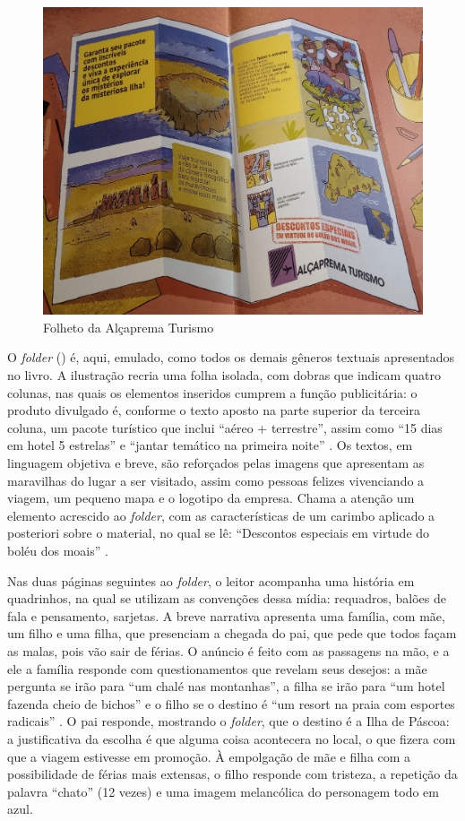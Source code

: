 \documentclass[portuguese]{textolivre}
\begin{document}
\begin{figure}[h!]
    \centering
    \includegraphics[width=0.85\linewidth]{Fig1.jpeg}
    \caption{Folheto da Alçaprema Turismo}
    \label{fig1}
\end{figure}

O \textit{folder} () é, aqui, emulado, como todos os demais gêneros
textuais apresentados no livro. A ilustração recria uma folha isolada, com
dobras que indicam quatro colunas, nas quais os elementos inseridos cumprem a
função publicitária: o produto divulgado é, conforme o texto aposto na parte
superior da terceira coluna, um pacote turístico que inclui “aéreo +
terrestre”, assim como “15 dias em hotel 5 estrelas” e “jantar temático na
primeira noite” \cite[p.~7]{franco_queda_2018}. Os textos, em linguagem
objetiva e breve, são reforçados pelas imagens que apresentam as maravilhas do
lugar a ser visitado, assim como pessoas felizes vivenciando a viagem, um
pequeno mapa e o logotipo da empresa. Chama a atenção um elemento acrescido ao
\textit{folder}, com as características de um carimbo aplicado a posteriori
sobre o material, no qual se lê: “Descontos especiais em virtude do boléu dos
moais” \cite[p.~7]{franco_queda_2018}.

Nas duas páginas seguintes ao \textit{folder}, o leitor acompanha uma história
em quadrinhos, na qual se utilizam as convenções dessa mídia: requadros, balões
de fala e pensamento, sarjetas. A breve narrativa apresenta uma família, com
mãe, um filho e uma filha, que presenciam a chegada do pai, que pede que todos
façam as malas, pois vão sair de férias. O anúncio é feito com as passagens na
mão, e a ele a família responde com questionamentos que revelam seus desejos: a
mãe pergunta se irão para “um chalé nas montanhas”, a filha se irão para “um
hotel fazenda cheio de bichos” e o filho se o destino é “um resort na praia com
esportes radicais” \cite[p.~8]{franco_queda_2018}. O pai responde, mostrando o
\textit{folder}, que o destino é a Ilha de Páscoa: a justificativa da escolha é
que alguma coisa acontecera no local, o que fizera com que a viagem estivesse
em promoção. À empolgação de mãe e filha com a possibilidade de férias mais
extensas, o filho responde com tristeza, a repetição da palavra “chato” (12
vezes) e uma imagem melancólica do personagem todo em azul.
\end{document}
